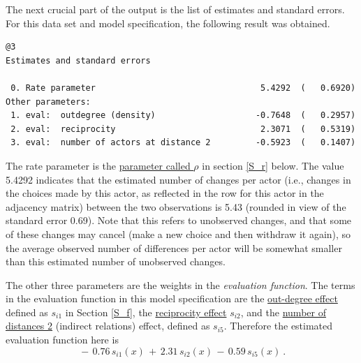 \documentclass[a4paper,fleqn]{article}
\newcommand{\+}{\, + \,}
\renewcommand{\min}{\, - \,}
\begin{document}
{\begin{screen}
\newpage
\end{screen}
\smallskip

The next crucial part of the output is the list of estimates and
standard errors. For this data set and model specification, the
following result was obtained.

{\footnotesize
\begin{verbatim}
@3
Estimates and standard errors

 0. Rate parameter                                 5.4292  (   0.6920)
Other parameters:
 1. eval:  outdegree (density)                    -0.7648  (   0.2957)
 2. eval:  reciprocity                             2.3071  (   0.5319)
 3. eval:  number of actors at distance 2         -0.5923  (   0.1407)
\end{verbatim}
}

The rate parameter is the
\hyperlink{T_rho}{parameter called $\rho$}
in section \ref{S_r} below. The value 5.4292 indicates
that the estimated number of changes per actor (i.e., changes in
the choices made by this actor, as reflected in the row for this
actor in the adjacency matrix) between the two observations is
5.43 (rounded in view of the standard error 0.69). Note that this
refers to unobserved changes, and that some of these changes may
cancel (make a new choice and then withdraw it again), so the
average observed number of differences per actor will be somewhat
smaller than this estimated number of unobserved changes.

The other three parameters are the weights in the \emph{evaluation function}.
The terms in the evaluation function in this model specification are
the \hyperlink{T_density}{out-degree effect} defined as $s_{i1}$ in
Section \ref{S_f}, the
\hyperlink{T_reci}{reciprocity effect}
$s_{i2}$, and the
\hyperlink{T_dist2}{number of distances 2}
(indirect relations) effect, defined as $s_{i5}$. Therefore the
estimated evaluation function here is
\[
\min 0.76\, s_{i1}(x) \+ 2.31\, s_{i2}(x) \min 0.59\, s_{i5}(x)~.
\]

}
\end{document}
